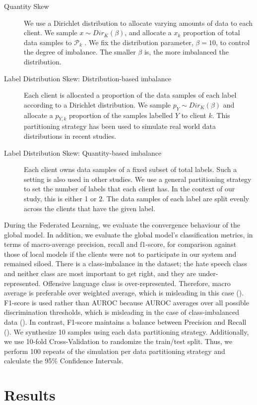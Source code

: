 \documentclass[letterpaper]{article} %
\begin{document}
\begin{description}
\item[Quantity Skew] We use a Dirichlet distribution to allocate varying amounts of data to each client. We sample $x \sim Dir_K (\beta)$, and allocate a $x_k$ proportion of total data samples to ${\mathcal{P}}_k$ . We fix the distribution parameter, $\beta=10$, to control the degree of imbalance. The smaller $\beta$ is, the more imbalanced the distribution.
\item[Label Distribution Skew: Distribution-based imbalance] Each client is allocated a proportion of the data samples of each label according to a Dirichlet distribution. We sample $p_Y \sim Dir_K(\beta)$ and allocate a $p_{Y,k}$ proportion of the samples labelled $Y$ to client $k$. This partitioning strategy has been used to simulate real world data distributions in recent studies.
\item[Label Distribution Skew: Quantity-based imbalance] Each client owns data samples of a fixed subset of total labels. Such a setting is also used in other studies. We use a general partitioning strategy to set the number of labels that each client has. In the context of our study, this is either 1 or 2. The data samples of each label are split evenly across the clients that have the given label.
\end{description}


During the Federated Learning, we evaluate the convergence behaviour of the global model. In addition, we evaluate the global model's classification metrics, in terms of macro-average precision, recall and f1-score, for comparison against those of local models if the clients were not to participate in our system and remained siloed. There is a class-imbalance in the dataset; the hate speech class and neither class are most important to get right, and they are under-represented. Offensive language class is over-represented. Therefore, macro average is preferable over weighted average, which is misleading in this case (). F1-score is used rather than AUROC because AUROC averages over all possible discrimination thresholds, which is misleading in the case of class-imbalanced data (). In contrast, F1-score maintains a balance between Precision and Recall (). We synthesize 10 samples using each data partitioning strategy. Additionally, we use 10-fold Cross-Validation to randomize the train/test split. Thus, we perform 100 repeats of the simulation per data partitioning strategy and calculate the 95\% Confidence Intervals.
\bigskip
\section{Results}
\end{document}
